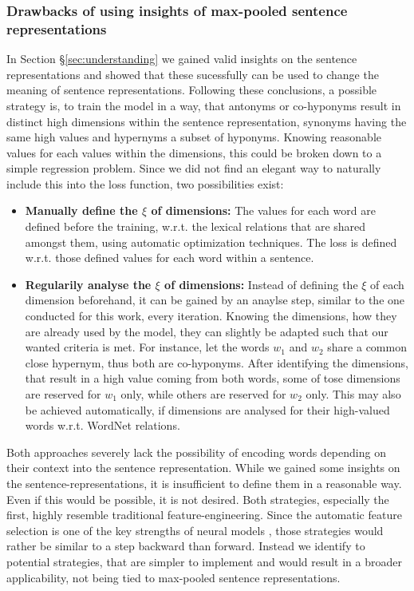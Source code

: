 \subsubsection{Drawbacks of using insights of max-pooled sentence representations}
In Section §\ref{sec:understanding} we gained valid insights on the sentence representations and showed that these sucessfully can be used to change the meaning of sentence representations. Following these conclusions, a possible strategy is, to train the model in a way, that antonyms or co-hyponyms result in distinct high dimensions within the sentence representation, synonyms having the same high values and hypernyms a subset of hyponyms. Knowing reasonable values for each values within the dimensions, this could be broken down to a simple regression problem. Since we did not find an elegant way to naturally include this into the loss function, two possibilities exist:
\begin{itemize}
\item \textbf{Manually define the $\xi$ of dimensions:} The values for each word are defined before the training, w.r.t. the lexical relations that are shared amongst them, using automatic optimization techniques. The loss is defined w.r.t. those defined values for each word within a sentence.
\item \textbf{Regularily analyse the $\xi$ of dimensions:} Instead of defining the $\xi$ of each dimension beforehand, it can be gained by an anaylse step, similar to the one conducted for this work, every iteration. Knowing the dimensions, how they are already used by the model, they can slightly be adapted such that our wanted criteria is met. For instance, let the words $w_1$ and $w_2$ share a common close hypernym, thus both are co-hyponyms. After identifying the dimensions, that result in a high value coming from both words, some of tose dimensions are reserved for $w_1$ only, while others are reserved for $w_2$ only. This may also be achieved automatically, if dimensions are analysed for their high-valued words w.r.t. WordNet relations.
\end{itemize}
Both approaches severely lack the possibility of encoding words depending on their context into the sentence representation. While we gained some insights on the sentence-representations, it is insufficient to define them in a reasonable way. Even if this would be possible, it is not desired. Both strategies, especially the first, highly resemble traditional feature-engineering. Since the automatic feature selection is one of the key strengths of neural models \citep{bengio2013representation}, those strategies would rather be similar to a step backward than forward. Instead we identify to potential strategies, that are simpler to implement and would result in a broader applicability, not being tied to max-pooled sentence representations.

